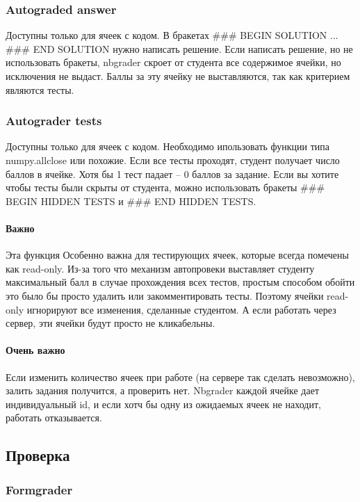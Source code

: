 \documentclass[a4paper,12pt]{article}
\begin{document}
\subsubsection{Autograded answer}

Доступны только для ячеек с кодом. В бракетах \#\#\# BEGIN SOLUTION ... \#\#\# END SOLUTION нужно написать решение. 
Если написать решение, но не использовать бракеты, nbgrader скроет от студента все содержимое ячейки, но исключения не выдаст. Баллы за эту ячейку не выставляются, так как критерием являются тесты. 

\subsubsection{Autograder tests}

Доступны только для ячеек с кодом. Необходимо ипользовать функции типа numpy.allclose или похожие. Если все тесты проходят, студент получает число баллов в ячейке. Хотя бы 1 тест падает -- 0 баллов за задание.
Если вы хотите чтобы тесты были скрыты от студента, можно использовать бракеты \#\#\# BEGIN HIDDEN TESTS и \#\#\# END HIDDEN TESTS.

\paragraph{Важно}
Эта функция Особенно важна для тестирующих ячеек, которые всегда помечены как read-only. Из-за того что механизм автопровеки выставляет студенту максимальный балл в случае прохождения всех тестов, простым способом обойти это было бы просто удалить или закомментировать тесты. Поэтому ячейки read-only игнорируют все изменения, сделанные студентом. А если работать через сервер, эти ячейки будут просто не кликабельны.

\paragraph{Очень важно}
Если изменить количество ячеек при работе (на сервере так сделать невозможно), залить задания получится, а проверить нет. Nbgrader каждой ячейке дает индивидуальный id, и если хотч бы одну из ожидаемых ячеек не находит, работать отказывается.
\subsection{Проверка}
\subsubsection{Formgrader}
\end{document}

